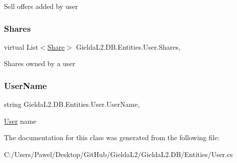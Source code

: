 Sell offers added by user 

\mbox{\label{class_gielda_l2_1_1_d_b_1_1_entities_1_1_user_ab46f7d5d748ace49f1d11b176e3527d9}} 
\subsubsection{\texorpdfstring{Shares}{Shares}}
{\footnotesize\ttfamily virtual List$<$\mbox{\hyperlink{class_gielda_l2_1_1_d_b_1_1_entities_1_1_share}{Share}}$>$ Gielda\+L2.\+D\+B.\+Entities.\+User.\+Shares\hspace{0.3cm}{\ttfamily [get]}, {\ttfamily [set]}}



Shares owned by a user 

\mbox{\label{class_gielda_l2_1_1_d_b_1_1_entities_1_1_user_adecd1c4376681df4136502e15d5a921c}} 
\subsubsection{\texorpdfstring{UserName}{UserName}}
{\footnotesize\ttfamily string Gielda\+L2.\+D\+B.\+Entities.\+User.\+User\+Name\hspace{0.3cm}{\ttfamily [get]}, {\ttfamily [set]}}



\mbox{\hyperlink{class_gielda_l2_1_1_d_b_1_1_entities_1_1_user}{User}} name 



The documentation for this class was generated from the following file\+:\begin{DoxyCompactItemize}
\item 
C\+:/\+Users/\+Pawel/\+Desktop/\+Git\+Hub/\+Gielda\+L2/\+Gielda\+L2.\+D\+B/\+Entities/User.\+cs\end{DoxyCompactItemize}
